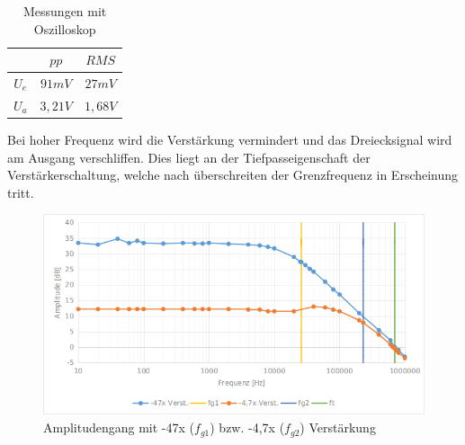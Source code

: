 \documentclass[12pt,a4paper,titlepage]{article}
\begin{document}
\begin{table}[H]
  \centering
  \begin{tabular}{c|c|c}
     & $pp$ & $RMS$ \\
     \hline
    $U_{e}$ & $91mV$ & $27mV$ \\
    \hline
    $U_{a}$ & $3,21V$ & $1,68V$
  \end{tabular}
  \caption{Messungen mit Oszilloskop}
\end{table}

\noindent Bei hoher Frequenz wird die Verstärkung vermindert und das Dreiecksignal wird am Ausgang verschliffen. Dies liegt an der Tiefpasseigenschaft der Verstärkerschaltung, welche nach überschreiten der Grenzfrequenz in Erscheinung tritt.

%
%
%

\begin{figure}[H]
  \centering
  \includegraphics[width=150mm]{bode.png}
  \caption{Amplitudengang mit -47x ($f_{g1}$) bzw. -4,7x ($f_{g2}$) Verstärkung}
\end{figure}
\end{document}
